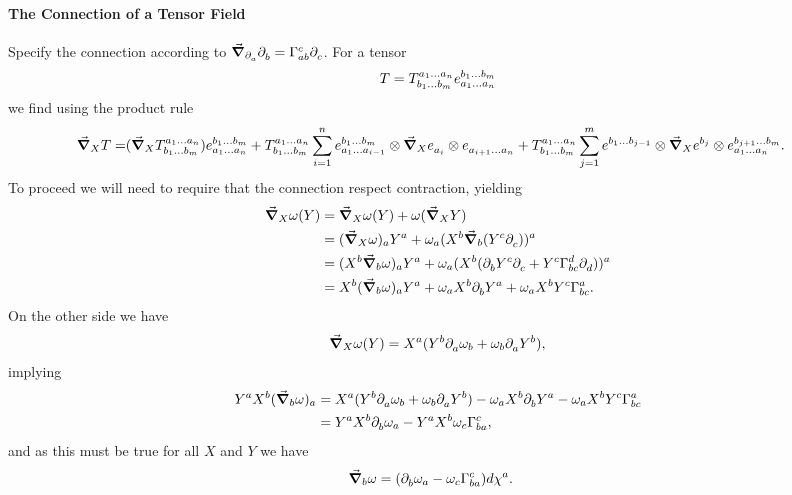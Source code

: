 \paragraph{The Connection of a Tensor Field}
Specify the connection according to $\dcov{\del{}{a}{}}{\del{}{b}{}} = \chris{c}{a}{b}\del{}{c}{}$. For a tensor
\begin{align*}
	T = \tensor*{T}{^{a_{1}\dots a_{n}}_{b_{1}\dots b_{m}}}\tensor*{e}{^{b_{1}\dots b_{m}}_{a_{1}\dots a_{n}}}
\end{align*}
we find using the product rule
\begin{align*}
	\dcov{X}{T} =& (\dcov{X}{\tensor*{T}{^{a_{1}\dots a_{n}}_{b_{1}\dots b_{m}}}})\tensor*{e}{^{b_{1}\dots b_{m}}_{a_{1}\dots a_{n}}} + \tensor*{T}{^{a_{1}\dots a_{n}}_{b_{1}\dots b_{m}}}\sum\limits_{i = 1}^{n}\tensor*{e}{^{b_{1}\dots b_{m}}_{a_{1}\dots a_{i - 1}}}\otimes\dcov{X}{\tensor*{e}{_{a_{i}}}}\otimes\tensor*{e}{_{a_{i + 1}\dots a_{n}}} + \tensor*{T}{^{a_{1}\dots a_{n}}_{b_{1}\dots b_{m}}}\sum\limits_{j = 1}^{m}\tensor*{e}{^{b_{1}\dots b_{j - 1}}}\otimes\dcov{X}{\tensor*{e}{^{b_{j}}}}\otimes\tensor*{e}{^{b_{j + 1}\dots b_{m}}_{a_{1}\dots a_{n}}}.
\end{align*}
To proceed we will need to require that the connection respect contraction, yielding
\begin{align*}
	\dcov{X}{\omega(Y)} &= \dcov{X}{\omega}(Y) + \omega(\dcov{X}{Y}) \\
	                    &= (\dcov{X}{\omega})_{a}Y^{a} + \omega_{a}(X^{b}\dcov{b}{(Y^{c}\del{}{c}{})})^{a} \\
	                    &= (X^{b}\dcov{b}{\omega})_{a}Y^{a} + \omega_{a}(X^{b}(\del{}{b}{Y^{c}}\del{}{c}{} + Y^{c}\chris{d}{b}{c}\del{}{d}{}))^{a} \\
	                    &= X^{b}(\dcov{b}{\omega})_{a}Y^{a} + \omega_{a}X^{b}\del{}{b}{Y^{a}} + \omega_{a}X^{b}Y^{c}\chris{a}{b}{c}.
\end{align*}
On the other side we have
\begin{align*}
	\grad_{X}{\omega(Y)} = X^{a}(Y^{b}\partial^{}_{a}{\omega_{b}} + \omega_{b}\partial^{}_{a}{Y^{b}}),
\end{align*}
implying
\begin{align*}
	Y^{a}X^{b}(\dcov{b}{\omega})_{a} &= X^{a}(Y^{b}\del{}{a}{\omega_{b}} + \omega_{b}\del{}{a}{Y^{b}}) - \omega_{a}X^{b}\del{}{b}{Y^{a}} - \omega_{a}X^{b}Y^{c}\chris{a}{b}{c} \\
	                                 &= Y^{a}X^{b}\del{}{b}{\omega_{a}} - Y^{a}X^{b}\omega_{c}\chris{c}{b}{a},
\end{align*}
and as this must be true for all $X$ and $Y$ we have
\begin{align*}
	\dcov{b}{\omega} &= (\del{}{b}{\omega_{a}} - \omega_{c}\chris{c}{b}{a})\df{\chi^{a}}.
\end{align*}

